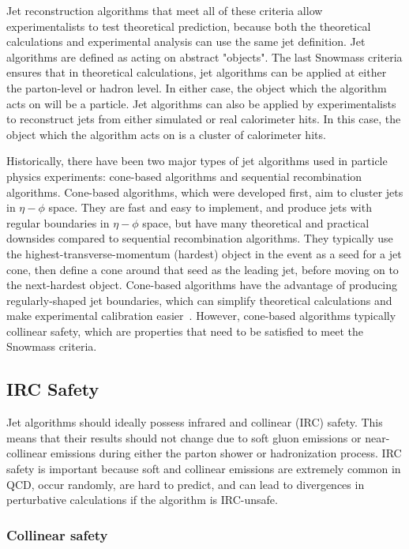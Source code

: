 Jet reconstruction algorithms that meet all of these criteria allow experimentalists to test theoretical prediction,
because both the theoretical calculations and experimental analysis can use the same jet definition.
Jet algorithms are defined as acting on abstract "objects".
The last Snowmass criteria ensures that in theoretical calculations,
jet algorithms can be applied at either the parton-level or hadron level.
In either case, the object which the algorithm acts on will be a particle.
Jet algorithms can also be applied by experimentalists to reconstruct jets from either simulated or real calorimeter hits.
In this case, the object which the algorithm acts on is a cluster of calorimeter hits.

Historically, there have been two major types of jet algorithms used in particle physics experiments:
cone-based algorithms and sequential recombination algorithms.
Cone-based algorithms, which were developed first, aim to cluster jets in $\eta-\phi$ space.
They are fast and easy to implement, and produce jets with regular boundaries in $\eta-\phi$ space,
but have many theoretical and practical downsides compared to sequential recombination algorithms.
They typically use the highest-transverse-momentum (hardest) object in the event as a seed for a jet cone,
then define a cone around that seed as the leading jet,
before moving on to the next-hardest object.
Cone-based algorithms have the advantage of producing regularly-shaped jet boundaries,
which can simplify theoretical calculations and make experimental calibration easier~\cite{jet-cone-algo}.
However, cone-based algorithms typically collinear safety,
which are properties that need to be satisfied to meet the Snowmass criteria.

\subsection{IRC Safety}\label{subsec:jet_irc_safety}

Jet algorithms should ideally possess infrared and collinear (IRC) safety.
This means that their results should not change due to soft gluon emissions or near-collinear emissions
during either the parton shower or hadronization process.
IRC safety is important because soft and collinear emissions are extremely common in QCD,
occur randomly, are hard to predict, and can lead to divergences in perturbative calculations if the algorithm is IRC-unsafe.\cite{jet-jetography}

\subsubsection{Collinear safety}

